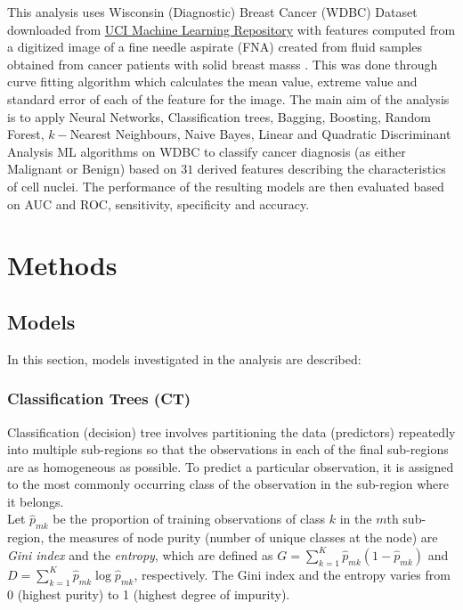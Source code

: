 \noindent This analysis uses  Wisconsin (Diagnostic) Breast Cancer (WDBC) Dataset downloaded from \href{https://archive.ics.uci.edu/ml/datasets/Breast+Cancer+Wisconsin+(Diagnostic)}{UCI Machine Learning Repository} with features computed from a digitized image of a fine needle aspirate (FNA) created from fluid samples obtained from cancer patients with solid breast masss \citep{ucidata}. This was done through curve fitting algorithm which calculates the mean value, extreme value and standard error of each of the feature for the image. The main aim of the analysis is to apply Neural Networks, Classification trees, Bagging, Boosting, Random Forest, $k-$Nearest Neighbours, Naive Bayes, Linear and Quadratic Discriminant Analysis ML algorithms on WDBC to classify cancer diagnosis (as either Malignant or Benign) based on $31$ derived features describing the characteristics of cell nuclei. The performance of the resulting models are then evaluated based on AUC and ROC, sensitivity, specificity and accuracy.

\clearpage
\section{Methods}

\subsection{Models}
In this section, models investigated in the analysis are described:

\subsubsection{Classification Trees (CT)}

Classification (decision) tree involves partitioning the data (predictors) repeatedly into multiple sub-regions so that the observations in each of the final sub-regions are as homogeneous as possible. To predict a particular observation, it is assigned to the most commonly occurring class of the observation in the sub-region where it belongs. \\

\noindent Let $\hat{p}_{mk}$ be the proportion of training observations of class $k$ in the $m$th sub-region, the measures of node purity (number of unique classes at the node) are \textit{Gini index} and the \textit{entropy}, which are defined as $G = \sum_{k=1}^K\hat{p}_{mk}(1-\hat{p}_{mk})$ and $D = \sum_{k=1}^K\hat{p}_{mk}\log \hat{p}_{mk}$, respectively. The Gini index and the entropy varies from 0 (highest purity) to 1 (highest degree of impurity).\\ 

